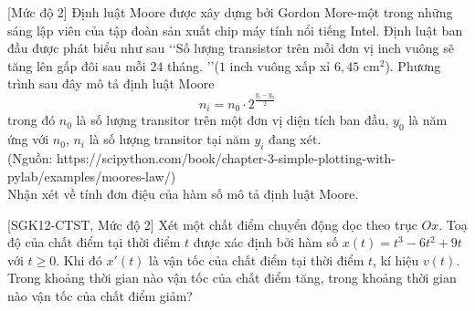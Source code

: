 \begin{bt}%
[Mức độ 2]%
	Định luật Moore được xây dựng bởi Gordon More-một trong những sáng lập viên của tập đoàn sản xuất chip máy tính nổi tiếng Intel. Định luật ban đầu được phát biểu như sau
	\lq\lq Số lượng transistor trên mỗi đơn vị inch vuông sẽ tăng lên gấp đôi sau mỗi $24$ tháng. \rq\rq ($1$ inch vuông xấp xỉ $6{,}45$ cm$^2$).
	Phương trình sau đây mô tả định luật Moore
	$$n_i=n_0\cdot 2^{\tfrac{y_i-y_0}{2}}$$
	trong đó $n_0$ là số lượng transitor trên một đơn vị diện tích ban đầu, $y_0$ là năm ứng với $n_0$, $n_i$ là số lượng transitor tại năm $y_i$ đang xét. \\
	(Nguồn: https://scipython.com/book/chapter-3-simple-plotting-with-pylab/examples/moores-law/)\\
	Nhận xét về tính đơn điệu của hàm số mô tả định luật Moore.
\end{bt}

\begin{bt}%
[SGK12-CTST, Mức độ 2]
	Xét một chất điểm chuyển động dọc theo trục $Ox$. Toạ độ của chất điểm tại thời điểm $t$ được xác định bởi hàm số $x(t)=t^3-6t^2+9t$ với $t\geq 0$. Khi đó $x'(t)$ là vận tốc của chất điểm tại thời điểm $t$, kí hiệu $v(t)$. Trong khoảng thời gian nào vận tốc của chất điểm tăng, trong khoảng thời gian nào vận tốc của chất điểm giảm?
\end{bt}

